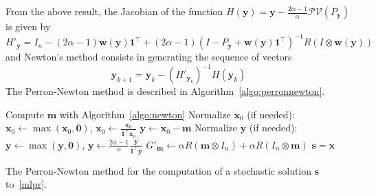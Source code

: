 \documentclass[10pt]{paper}
\DeclarePairedDelimiter{\norm}{\lVert}{\rVert}
\begin{document}
From the above result, the Jacobian of the function
$H({\mathbf{y}})={\mathbf{y}} - \frac{2\alpha-1}{\alpha} \mathcal{PV}(P_{\mathbf{y}})$ is given by
\begin{equation} \label{Jacnewt}
	H'_{\mathbf{y}} = I_n -  (2\alpha-1) {\mathbf{w}}({\mathbf{y}}) {\mathbf{1}}^\top + (2\alpha-1)(I-P_{\mathbf{y}} + {\mathbf{w}}({\mathbf{y}}){\mathbf{1}}^\top)^{-1}R(I\otimes {\mathbf{w}}({\mathbf{y}}))
\end{equation}
and Newton's method consists in generating the sequence of vectors
\[
{\mathbf{y}}_{k+1}={\mathbf{y}}_k-(H'_{{\mathbf{y}}_k})^{-1} H({\mathbf{y}}_k)
\]
The Perron-Newton method is described in Algorithm~\ref{algo:perronnewton}.
\begin{algorithm}
Compute ${\mathbf{m}}$ with Algorithm~\ref{algo:newton}\;
Normalize ${\mathbf{x}}_0$ (if needed): ${\mathbf{x}}_0 \leftarrow \max({\mathbf{x}}_0,\mathbf{0})$, ${\mathbf{x}}_0 \leftarrow \frac{{\mathbf{x}}_0}{{\mathbf{1}}^\top {\mathbf{x}}_0}$\;
${\mathbf{y}} \leftarrow {\mathbf{x}}_0 - {\mathbf{m}}$\;
Normalize ${\mathbf{y}}$ (if needed): ${\mathbf{y}} \leftarrow \max({\mathbf{y}},\mathbf{0})$, ${\mathbf{y}} \leftarrow \frac{2\alpha-1}{\alpha} \frac{\mathbf{y}}{{\mathbf{1}}^\top {\mathbf{y}}}$\;
$G'_{\mathbf{m}} \leftarrow  \alpha R({\mathbf{m}} \otimes I_n) + \alpha R(I_n \otimes {\mathbf{m}})$\;
${\mathbf{s}} = {\mathbf{x}}$\;
\caption{The Perron-Newton method for the computation of a stochastic solution ${\mathbf{s}}$ to~\eqref{mlpr}.} \label{algo:perronnewton}
\end{algorithm}
\end{document}
